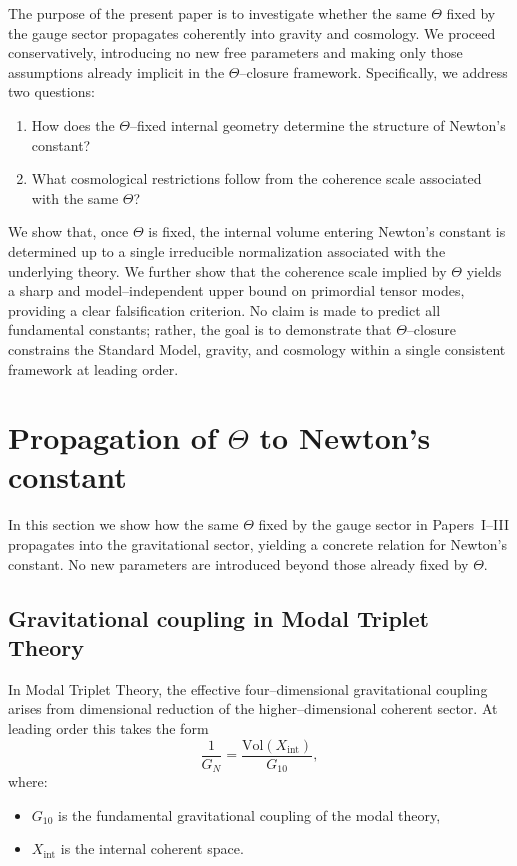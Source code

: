 \documentclass[11pt]{article}
\begin{document}
The purpose of the present paper is to investigate whether the same $\Theta$
fixed by the gauge sector propagates coherently into gravity and cosmology.
We proceed conservatively, introducing no new free parameters and making only
those assumptions already implicit in the $\Theta$--closure framework.
Specifically, we address two questions:
\begin{enumerate}
\item How does the $\Theta$--fixed internal geometry determine the structure of
Newton's constant?
\item What cosmological restrictions follow from the coherence scale associated
with the same $\Theta$?
\end{enumerate}

We show that, once $\Theta$ is fixed, the internal volume entering Newton's
constant is determined up to a single irreducible normalization associated with
the underlying theory.
We further show that the coherence scale implied by $\Theta$ yields a sharp and
model--independent upper bound on primordial tensor modes, providing a clear
falsification criterion.
No claim is made to predict all fundamental constants; rather, the goal is to
demonstrate that $\Theta$--closure constrains the Standard Model, gravity, and
cosmology within a single consistent framework at leading order.


\section{Propagation of $\Theta$ to Newton's constant}

In this section we show how the same $\Theta$ fixed by the gauge sector in
Papers~I--III propagates into the gravitational sector, yielding a concrete
relation for Newton's constant.
No new parameters are introduced beyond those already fixed by $\Theta$.

\subsection{Gravitational coupling in Modal Triplet Theory}

In Modal Triplet Theory, the effective four--dimensional gravitational coupling
arises from dimensional reduction of the higher--dimensional coherent sector.
At leading order this takes the form
\begin{equation}
\frac{1}{G_N}
=
\frac{\mathrm{Vol}(X_{\mathrm{int}})}{G_{10}},
\label{eq:GN_reduction}
\end{equation}
where:
\begin{itemize}
\item $G_{10}$ is the fundamental gravitational coupling of the modal theory,
\item $X_{\mathrm{int}}$ is the internal coherent space.
\end{itemize}
\end{document}
